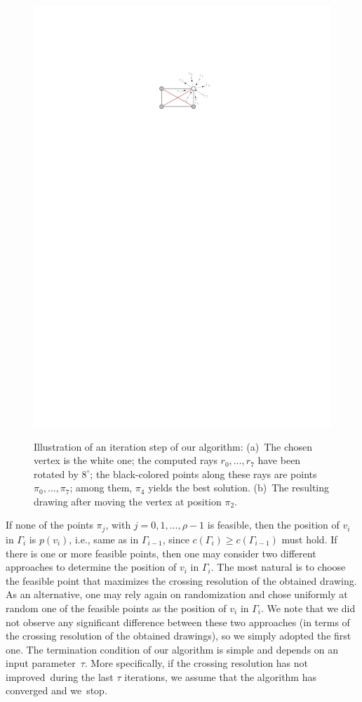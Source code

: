 \documentclass[runningheads]{llncs}
\begin{document}
\begin{figure}[t!]
{	\includegraphics[page=2, scale=0.9]{figures/algorithm}}
	\caption{%
	Illustration of an iteration step of our algorithm:
	(a)~The chosen vertex is the white one;
	the computed rays $r_0,\ldots,r_7$ have been rotated by $8^\circ$;
	the black-colored points along these rays are points $\pi_0,\ldots,\pi_7$;
	among them, $\pi_4$ yields the best solution.
	(b)~The resulting drawing after moving the vertex at position $\pi_2$.}
	\label{fig:algo}
\end{figure}

If none of the points $\pi_j$, with $j=0,1,\ldots,\rho-1$ is feasible, then the position of $v_i$ in $\Gamma_i$ is $p(v_i)$, i.e., same as in $\Gamma_{i-1}$, since $c(\Gamma_i) \geq c(\Gamma_{i-1})$ must hold. If there is one or more feasible points, then one may consider two different approaches to determine the position of $v_i$ in $\Gamma_i$. The most natural is to choose the feasible point that maximizes the crossing resolution of the obtained drawing. As an alternative, one may rely again on randomization and chose uniformly at random one of the feasible points as the position of $v_i$ in $\Gamma_i$. We note that we did not observe any significant difference between these two approaches (in terms of the crossing resolution of the obtained drawings), so we simply adopted the first one. 
The termination condition of our algorithm is simple and depends on an in\-put parameter~$\tau$. More specifically, if the crossing resolution has not improved~during the last $\tau$ iterations, we assume that the algorithm has converged and we~stop.
\end{document}
